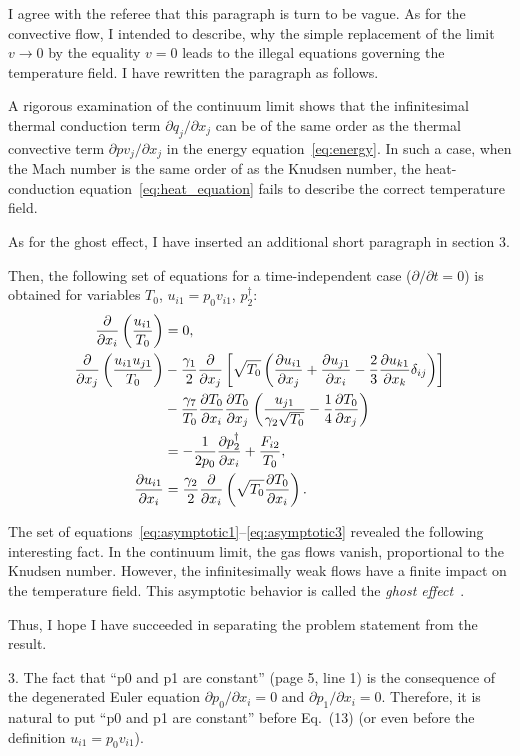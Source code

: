 \documentclass{article}
\newcommand{\pder}[2][]{\frac{\partial#1}{\partial#2}}
\newcommand{\Pder}[2][]{\partial#1/\partial#2}
\def\asterism{\par\vspace{1em}{\centering\scalebox{1}{\bfseries *~*~*}\par}\vspace{.5em}\par}
\begin{document}
I agree with the referee that this paragraph is turn to be vague.
As for the convective flow, I intended to describe, why the simple replacement of the limit \(v\to0\)
by the equality \(v=0\) leads to the illegal equations governing the temperature field.
I have rewritten the paragraph as follows.
\begin{leftbar}
A rigorous examination of the continuum limit shows that the infinitesimal thermal conduction term \(\Pder[q_j]{x_j}\)
can be of the same order as the thermal convective term \(\Pder[pv_j]{x_j}\) in the energy equation~\eqref{eq:energy}.
In such a case, when the Mach number is the same order of as the Knudsen number,
the heat-conduction equation~\eqref{eq:heat_equation} fails to describe
the correct temperature field.
\end{leftbar}
As for the ghost effect, I have inserted an additional short paragraph in section 3.
\begin{leftbar}
Then, the following set of equations for a time-independent case (\(\Pder{t} = 0\))
is obtained for variables \(T_0\), \(u_{i1} = p_0v_{i1}\), \(p_2^\dag\):
\begin{align}
	\pder{x_i}\left(\frac{u_{i1}}{T_0}\right) &= 0, \label{eq:asymptotic1} \\
	\pder{x_j}\left(\frac{u_{i1}u_{j1}}{T_0}\right)
		&-\frac{\gamma_1}2\pder{x_j}\left[\sqrt{T_0}\left(
			\pder[u_{i1}]{x_j}+\pder[u_{j1}]{x_i}-\frac23\pder[u_{k1}]{x_k}\delta_{ij}\right
		)\right] \notag\\
		&- \frac{\gamma_7}{T_0}\pder[T_0]{x_i}\pder[T_0]{x_j}\left(\frac{u_{j1}}{\gamma_2\sqrt{T_0}} - \frac{1}4\pder[T_0]{x_j}\right) \notag\\
		&= -\frac1{2p_0}\pder[p_2^\dag]{x_i} + \frac{F_{i2}}{T_0}, \label{eq:asymptotic2} \\
	\pder[u_{i1}]{x_i} &= \frac{\gamma_2}2\pder{x_i}\left(\sqrt{T_0}\pder[T_0]{x_i}\right). \label{eq:asymptotic3}
\end{align}
\asterism
The set of equations~\eqref{eq:asymptotic1}--\eqref{eq:asymptotic3} revealed the following interesting fact.
In the continuum limit, the gas flows vanish, proportional to the Knudsen number.
However, the infinitesimally weak flows have a finite impact on the temperature field.
This asymptotic behavior is called the \emph{ghost effect}~\cite{GhostEffect, Sone2002, Sone2007}.
\end{leftbar}
Thus, I hope I have succeeded in separating the problem statement from the result.

\begin{quoting}
3. The fact that ``p0 and p1 are constant'' (page 5, line 1) is the
consequence of the degenerated Euler equation \(\Pder[p_0]{x_i} = 0\) and
\(\Pder[p_1]{x_i} = 0\). Therefore, it is natural to put ``p0 and p1 are constant'' before
Eq.~(13) (or even before the definition \(u_{i1} = p_0v_{i1}\)).
\end{quoting}
\end{document}
